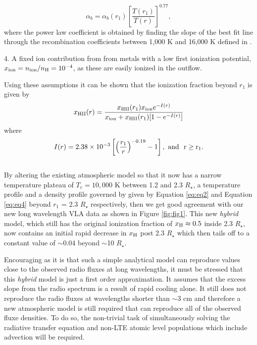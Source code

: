 \documentclass[iop]{emulateapj}
\begin{document}
\begin{equation}
\alpha _{b} = \alpha _{b}(r_{1})\left[\frac{T(r_1)}{T(r)}\right]^{0.77},
\label{eq:eq3}
\end{equation}
where the power law coefficient is obtained by finding the slope of the best fit line through the recombination coefficients between 1,000 K and 16,000 K defined in \cite{1978ppim.book.....S}.
\item 4. A fixed ion contribution from from metals with a low first ionization potential, $x_{\rm{ion}}=n_{\rm{ion}}/n_{\rm{H}}=10^{-4}$, as these are easily ionized in the outflow.
\item Using these assumptions it can be shown that the ionization fraction beyond $r_{1}$ is given by \citep{1986ApJ...306..605G}
\begin{equation}
x_{\rm{HII}}(r)= \frac{x_{\rm{HII}}(r_1)x_{\rm{ion}}e^{-I(r)}}{x_{\rm{ion}}+x_{\rm{HII}}(r_1)[1 - e^{-I(r)}]}
\label{eq:eq4}
\end{equation}
where
\begin{equation}
I(r) = 2.38 \times 10^{-3} \left[\left( \frac{r_{1}}{r}\right)^{-0.19} -1 \right], \ \rm{and} \ \  r \geq r_{1}.
\label{eq:eq5}
\end{equation}
\\
By altering the existing atmospheric model so that it now has a narrow temperature  plateau of $T_e = 10,000$ K between 1.2 and 2.3 $R_{\star}$, a temperature profile and a density profile governed by given by Equation \ref{eq:eq2}  and Equation \ref{eq:eq4} beyond $r_{1}$ = 2.3 $R_{\star}$ respectively, then we get  good agreement with our new long wavelength VLA data as shown in Figure \ref{fig:fig1}. This new \textit{hybrid} model, which still has the original ionization fraction of $x_{\rm{H}} \approx 0.5$ inside 2.3 $R_{\star}$, now contains an  initial rapid decrease in $x_{\rm{H}}$ post 2.3 $R_{\star}$ which then tails off to a constant value of $\sim$0.04 beyond $\sim$10 $R_{\star}$.

Encouraging as it is that such a simple analytical model can reproduce values close to the observed radio fluxes at long wavelengths, it must be stressed that this \textit{hybrid} model is just a first order approximation. It assumes that the excess slope from the radio spectrum is a result of rapid cooling alone. It still does not reproduce the radio fluxes at wavelengths shorter than $\sim$3 cm and therefore a new atmospheric model is still required that can reproduce all of the observed fluxe densities. To do so, the non-trivial task of simultaneously solving the radiative transfer equation and non-LTE atomic level populations which include advection will be required.
\end{document}
